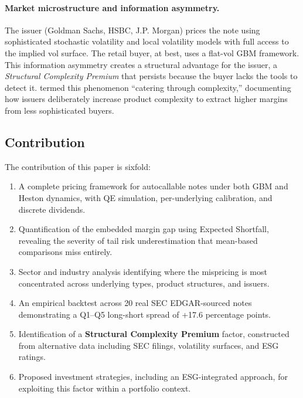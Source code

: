 \documentclass[12pt,a4paper]{article}
\begin{document}
\paragraph{Market microstructure and information asymmetry.} The issuer (Goldman Sachs, HSBC, J.P. Morgan) prices the note using sophisticated stochastic volatility and local volatility models with full access to the implied vol surface. The retail buyer, at best, uses a flat-vol GBM framework. This information asymmetry creates a structural advantage for the issuer, a \textit{Structural Complexity Premium} that persists because the buyer lacks the tools to detect it. \citet{celerier2017} termed this phenomenon ``catering through complexity,'' documenting how issuers deliberately increase product complexity to extract higher margins from less sophisticated buyers.

\subsection{Contribution}

The contribution of this paper is sixfold:
\begin{enumerate}[leftmargin=2cm]
    \item A complete pricing framework for autocallable notes under both GBM and Heston dynamics, with QE simulation, per-underlying calibration, and discrete dividends.
    \item Quantification of the embedded margin gap using Expected Shortfall, revealing the severity of tail risk underestimation that mean-based comparisons miss entirely.
    \item Sector and industry analysis identifying where the mispricing is most concentrated across underlying types, product structures, and issuers.
    \item An empirical backtest across 20 real SEC EDGAR-sourced notes demonstrating a Q1--Q5 long-short spread of +17.6 percentage points.
    \item Identification of a \textbf{Structural Complexity Premium} factor, constructed from alternative data including SEC filings, volatility surfaces, and ESG ratings.
    \item Proposed investment strategies, including an ESG-integrated approach, for exploiting this factor within a portfolio context.
\end{enumerate}

\newpage
\end{document}
